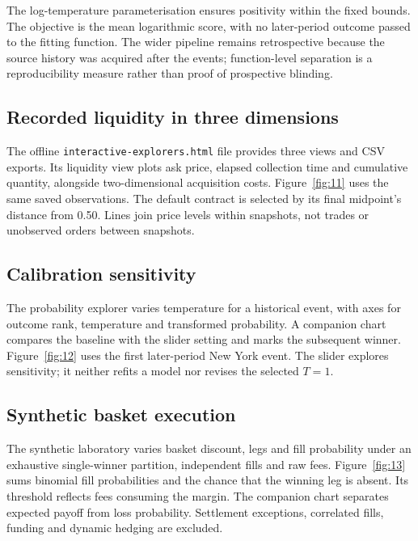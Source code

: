 

The log-temperature parameterisation ensures positivity within the fixed bounds. The objective is the mean logarithmic score, with no later-period outcome passed to the fitting function. The wider pipeline remains retrospective because the source history was acquired after the events; function-level separation is a reproducibility measure rather than proof of prospective blinding.

\label{app:explorers}
\subsection{Recorded liquidity in three dimensions}
The offline \texttt{interactive-explorers.html} file provides three views and CSV exports. Its liquidity view plots ask price, elapsed collection time and cumulative quantity, alongside two-dimensional acquisition costs. Figure~\ref{fig:11} uses the same saved observations. The default contract is selected by its final midpoint's distance from 0.50. Lines join price levels within snapshots, not trades or unobserved orders between snapshots.


\subsection{Calibration sensitivity}
The probability explorer varies temperature for a historical event, with axes for outcome rank, temperature and transformed probability. A companion chart compares the baseline with the slider setting and marks the subsequent winner. Figure~\ref{fig:12} uses the first later-period New York event. The slider explores sensitivity; it neither refits a model nor revises the selected $T=1$.


\subsection{Synthetic basket execution}
The synthetic laboratory varies basket discount, legs and fill probability under an exhaustive single-winner partition, independent fills and raw fees. Figure~\ref{fig:13} sums binomial fill probabilities and the chance that the winning leg is absent. Its threshold reflects fees consuming the margin. The companion chart separates expected payoff from loss probability. Settlement exceptions, correlated fills, funding and dynamic hedging are excluded.



